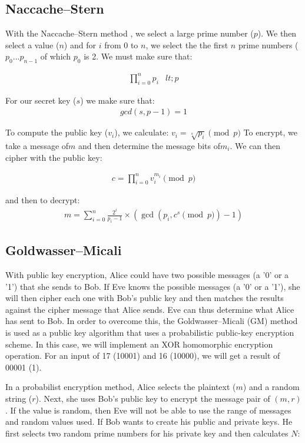 \documentclass[envcountsame,runningheads,notitlepage]{llncs}
\begin{document}
\subsection{Naccache–Stern}
With the Naccache–Stern method \cite{naccache1997new,asecuritysite_99911}, we select a large prime number ($p$). We then select a value ($n$) and for $i$ from 0 to $n$, we select the the first $n$ prime numbers ($p_0 ... p_{n-1}$ of which $p_0$ is 2. We must make sure that:

\begin{align}
\displaystyle \prod _{i=0}^{n}p_{i}&lt;p 
\end{align}

For our secret key ($s$) we make sure that:
\begin{align}
gcd(s,p-1)=1
\end{align}

To compute the public key ($v_i$), we calculate:
$ \displaystyle v_{i}={\sqrt[{s}]{p_{i}}}\pmod p $
To encrypt, we take a message of$m$ and then determine the message bits of$m_i$. We can then cipher with the public key:

\begin{align}
\displaystyle c=\prod _{i=0}^{n}v_{i}^{m_{i}}\pmod p
\end{align}

and then to decrypt:
\begin{align}
\displaystyle m=\sum _{i=0}^{n}{\frac {2^{i}}{p_{i}-1}}\times \left(\gcd(p_{i},c^{s}\pmod p)-1\right)
\end{align}

\subsection{Goldwasser–Micali}
With public key encryption, Alice could have two possible messages (a '0' or a '1') that she sends to Bob. If Eve knows the possible messages (a '0' or a '1'), she will then cipher each one with Bob's public key and then matches the results against the cipher message that Alice sends. Eve can thus determine what Alice has sent to Bob. In order to overcome this, the Goldwasser–Micali (GM) method is used as a public key algorithm that uses a probabilistic public-key encryption scheme. In this case, we will implement an XOR homomorphic encryption operation. For an input of 17 (10001) and 16 (10000), we will get a result of 00001 (1). 

In a probabilist encryption method, Alice selects the plaintext ($m$) and a random string ($r$). Next, she uses Bob's public key to encrypt the message pair of $(m,r)$. If the value is random, then Eve will not be able to use the range of messages and random values used. If Bob wants to create his public and private keys. He first selects two random prime numbers for his private key and then calculates $N$:
\end{document}
